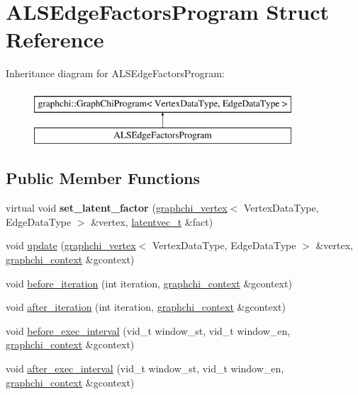 \hypertarget{struct_a_l_s_edge_factors_program}{\section{A\-L\-S\-Edge\-Factors\-Program Struct Reference}
\label{struct_a_l_s_edge_factors_program}
}
Inheritance diagram for A\-L\-S\-Edge\-Factors\-Program\-:\begin{figure}[H]
\begin{center}
\leavevmode
\includegraphics[height=2.000000cm]{struct_a_l_s_edge_factors_program}
\end{center}
\end{figure}
\subsection*{Public Member Functions}
\begin{DoxyCompactItemize}
\item 
\hypertarget{struct_a_l_s_edge_factors_program_a71a6c8e94e89219883d740d40aa954f5}{virtual void {\bfseries set\-\_\-latent\-\_\-factor} (\hyperlink{classgraphchi_1_1graphchi__vertex}{graphchi\-\_\-vertex}$<$ Vertex\-Data\-Type, Edge\-Data\-Type $>$ \&vertex, \hyperlink{structlatentvec__t}{latentvec\-\_\-t} \&fact)}\label{struct_a_l_s_edge_factors_program_a71a6c8e94e89219883d740d40aa954f5}

\item 
void \hyperlink{struct_a_l_s_edge_factors_program_a7d1185171e5172f9f36116399839144a}{update} (\hyperlink{classgraphchi_1_1graphchi__vertex}{graphchi\-\_\-vertex}$<$ Vertex\-Data\-Type, Edge\-Data\-Type $>$ \&vertex, \hyperlink{structgraphchi_1_1graphchi__context}{graphchi\-\_\-context} \&gcontext)
\item 
void \hyperlink{struct_a_l_s_edge_factors_program_af42abf2a610775eb04c6d86c380e9af4}{before\-\_\-iteration} (int iteration, \hyperlink{structgraphchi_1_1graphchi__context}{graphchi\-\_\-context} \&gcontext)
\item 
void \hyperlink{struct_a_l_s_edge_factors_program_a42253a307302cab9a42b44d78cadf57a}{after\-\_\-iteration} (int iteration, \hyperlink{structgraphchi_1_1graphchi__context}{graphchi\-\_\-context} \&gcontext)
\item 
void \hyperlink{struct_a_l_s_edge_factors_program_a2986001d68d1195e1c3c4e2e52e6d405}{before\-\_\-exec\-\_\-interval} (vid\-\_\-t window\-\_\-st, vid\-\_\-t window\-\_\-en, \hyperlink{structgraphchi_1_1graphchi__context}{graphchi\-\_\-context} \&gcontext)
\item 
void \hyperlink{struct_a_l_s_edge_factors_program_a20c35d6d2fbb937408f2bba3fe68bf5d}{after\-\_\-exec\-\_\-interval} (vid\-\_\-t window\-\_\-st, vid\-\_\-t window\-\_\-en, \hyperlink{structgraphchi_1_1graphchi__context}{graphchi\-\_\-context} \&gcontext)
\end{DoxyCompactItemize}
